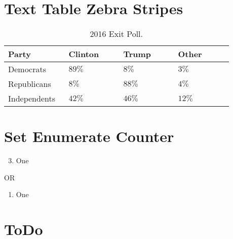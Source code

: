 \section{Text Table Zebra Stripes}
\begin{table}[H]
	\centering
	\begin{tabularx}{0.95\linewidth}{
			p{0.22\linewidth}
			p{0.22\linewidth}
			p{0.22\linewidth}
			p{0.22\linewidth}}
		\toprule
		\textbf{Party} & \textbf{Clinton} & \textbf{Trump} & \textbf{Other} \\
		\midrule
		Democrats & $ 89\% $ & $ 8\% $ & $ 3\% $ \\
		Republicans & $ 8\% $ & $ 88\% $ & $ 4\% $ \\
		Independents & $ 42\% $ & $ 46\% $ & $ 12\% $ \\
		\bottomrule
	\end{tabularx}
	\caption{2016 Exit Poll.}
	\label{tab06.02}
\end{table}

\section{Set Enumerate Counter}
\begin{enumerate}
	\setcounter{enumi}{2} %
	
	\item One
\end{enumerate}

OR

\begin{enumerate}[resume]
	\item One
\end{enumerate}

\section{ToDo}

